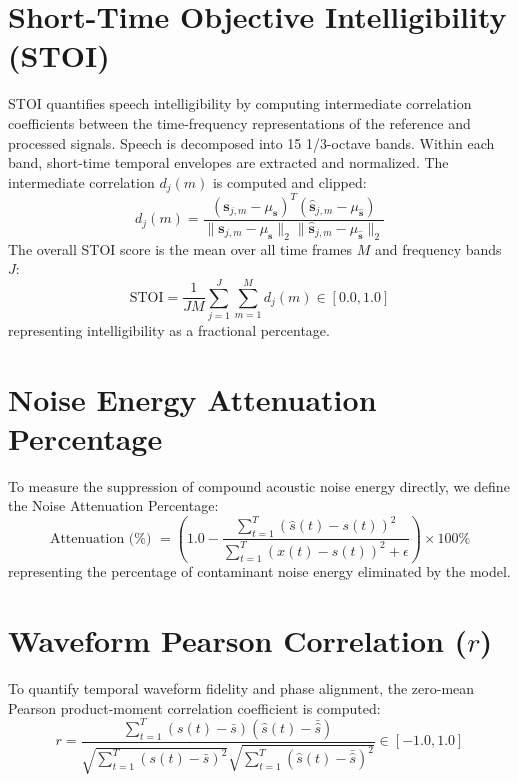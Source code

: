 \documentclass[11pt,a4paper]{report}
\begin{document}
\section{Short-Time Objective Intelligibility (STOI)}
STOI \cite{taal2011algorithm} quantifies speech intelligibility by computing intermediate correlation coefficients between the time-frequency representations of the reference and processed signals. Speech is decomposed into 15 1/3-octave bands. Within each band, short-time temporal envelopes are extracted and normalized. The intermediate correlation $d_j(m)$ is computed and clipped:
\begin{equation}
    d_j(m) = \frac{(\mathbf{s}_{j,m} - \mu_{\mathbf{s}})^T (\hat{\mathbf{s}}_{j,m} - \mu_{\hat{\mathbf{s}}})}{\|\mathbf{s}_{j,m} - \mu_{\mathbf{s}}\|_2 \|\hat{\mathbf{s}}_{j,m} - \mu_{\hat{\mathbf{s}}}\|_2}
\end{equation}
The overall STOI score is the mean over all time frames $M$ and frequency bands $J$:
\begin{equation}
    \text{STOI} = \frac{1}{JM} \sum_{j=1}^J \sum_{m=1}^M d_j(m) \in [0.0, 1.0]
\end{equation}
representing intelligibility as a fractional percentage.

\section{Noise Energy Attenuation Percentage}
To measure the suppression of compound acoustic noise energy directly, we define the Noise Attenuation Percentage:
\begin{equation}
    \text{Attenuation (\%) } = \left( 1.0 - \frac{\sum_{t=1}^T (\hat{s}(t) - s(t))^2}{\sum_{t=1}^T (x(t) - s(t))^2 + \epsilon} \right) \times 100\%
    \label{eq:noise_atten_formula}
\end{equation}
representing the percentage of contaminant noise energy eliminated by the model.

\section{Waveform Pearson Correlation ($r$)}
To quantify temporal waveform fidelity and phase alignment, the zero-mean Pearson product-moment correlation coefficient is computed:
\begin{equation}
    r = \frac{\sum_{t=1}^T (s(t) - \bar{s})(\hat{s}(t) - \bar{\hat{s}})}{\sqrt{\sum_{t=1}^T (s(t) - \bar{s})^2} \sqrt{\sum_{t=1}^T (\hat{s}(t) - \bar{\hat{s}})^2}} \in [-1.0, 1.0]
    \label{eq:pearson_r}
\end{equation}
\end{document}

